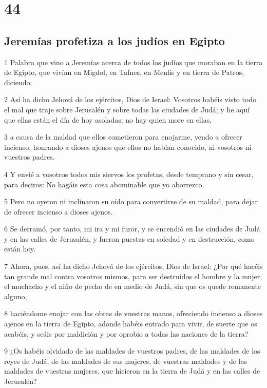 \chapter{44}

\section*{Jeremías profetiza a los judíos en Egipto}

\par 1 Palabra que vino a Jeremías acerca de todos los judíos que moraban en la tierra de Egipto, que vivían en Migdol, en Tafnes, en Menfis y en tierra de Patros, diciendo:
\par 2 Así ha dicho Jehová de los ejércitos, Dios de Israel: Vosotros habéis visto todo el mal que traje sobre Jerusalén y sobre todas las ciudades de Judá; y he aquí que ellas están el día de hoy asoladas; no hay quien more en ellas,
\par 3 a causa de la maldad que ellos cometieron para enojarme, yendo a ofrecer incienso, honrando a dioses ajenos que ellos no habían conocido, ni vosotros ni vuestros padres.
\par 4 Y envié a vosotros todos mis siervos los profetas, desde temprano y sin cesar, para deciros: No hagáis esta cosa abominable que yo aborrezco.
\par 5 Pero no oyeron ni inclinaron su oído para convertirse de su maldad, para dejar de ofrecer incienso a dioses ajenos.
\par 6 Se derramó, por tanto, mi ira y mi furor, y se encendió en las ciudades de Judá y en las calles de Jerusalén, y fueron puestas en soledad y en destrucción, como están hoy.
\par 7 Ahora, pues, así ha dicho Jehová de los ejércitos, Dios de Israel: ¿Por qué hacéis tan grande mal contra vosotros mismos, para ser destruidos el hombre y la mujer, el muchacho y el niño de pecho de en medio de Judá, sin que os quede remanente alguno,
\par 8 haciéndome enojar con las obras de vuestras manos, ofreciendo incienso a dioses ajenos en la tierra de Egipto, adonde habéis entrado para vivir, de suerte que os acabéis, y seáis por maldición y por oprobio a todas las naciones de la tierra?
\par 9 ¿Os habéis olvidado de las maldades de vuestros padres, de las maldades de los reyes de Judá, de las maldades de sus mujeres, de vuestras maldades y de las maldades de vuestras mujeres, que hicieron en la tierra de Judá y en las calles de Jerusalén?
